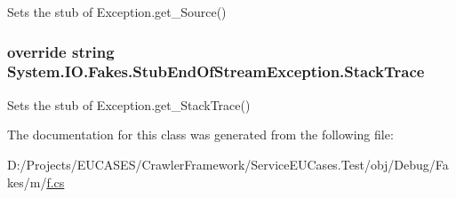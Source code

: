 Sets the stub of Exception.\-get\-\_\-\-Source()

\hypertarget{class_system_1_1_i_o_1_1_fakes_1_1_stub_end_of_stream_exception_adcf9b975e3228ff7a1979f28ceff7ed4}{
\subsubsection[{Stack\-Trace}]{\setlength{\rightskip}{0pt plus 5cm}override string System.\-I\-O.\-Fakes.\-Stub\-End\-Of\-Stream\-Exception.\-Stack\-Trace\hspace{0.3cm}{\ttfamily [get]}}}\label{class_system_1_1_i_o_1_1_fakes_1_1_stub_end_of_stream_exception_adcf9b975e3228ff7a1979f28ceff7ed4}


Sets the stub of Exception.\-get\-\_\-\-Stack\-Trace()



The documentation for this class was generated from the following file\-:\begin{DoxyCompactItemize}
\item 
D\-:/\-Projects/\-E\-U\-C\-A\-S\-E\-S/\-Crawler\-Framework/\-Service\-E\-U\-Cases.\-Test/obj/\-Debug/\-Fakes/m/\hyperlink{m_2f_8cs}{f.\-cs}\end{DoxyCompactItemize}
